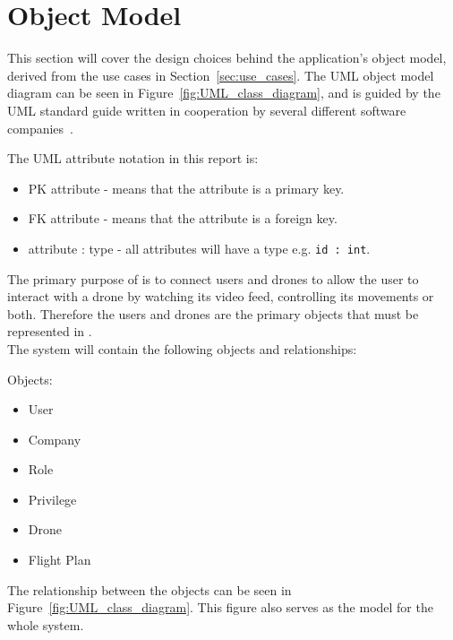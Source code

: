 \section{Object Model}
\label{section:uml_notation}
\label{subsec:objects}

This section will cover the design choices behind the application’s object model, derived from the use cases in Section~\ref{sec:use_cases}. The UML object model diagram can be seen in Figure~\ref{fig:UML_class_diagram}, and is guided by the UML standard guide written in cooperation by several different software companies~\citep{UML_notation}.

The UML attribute notation in this report is:
\begin{itemize}
    \item PK attribute - means that the attribute is a primary key.
    \item FK attribute - means that the attribute is a foreign key.
    \item attribute : type - all attributes will have a type e.g. \verb+id : int+.
\end{itemize}

The primary purpose of \projectname{} is to connect users and drones to allow the user to interact with a drone by watching its video feed, controlling its movements or both.
Therefore the users and drones are the primary objects that must be represented in \projectname{}.\\

The system will contain the following objects and relationships:

Objects:
\begin{itemize}
    \item User
    \item Company
    \item Role
    \item Privilege
    \item Drone
    \item Flight Plan
\end{itemize}

The relationship between the objects can be seen in Figure~\ref{fig:UML_class_diagram}.
This figure also serves as the model for the whole system.\\

